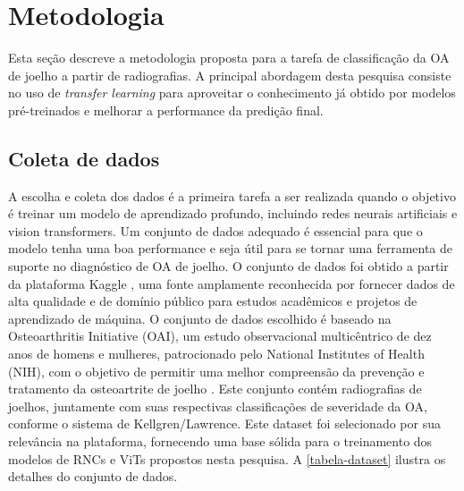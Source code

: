 \chapter{Metodologia}\label{cap:proposta}

Esta seção descreve a metodologia proposta para a tarefa de classificação da OA de joelho a partir de radiografias. A principal abordagem desta pesquisa consiste no uso de \textit{transfer learning} para aproveitar o conhecimento já obtido por modelos pré-treinados e melhorar a performance da predição final.

\section{Coleta de dados}

A escolha e coleta dos dados é a primeira tarefa a ser realizada quando o objetivo é treinar um modelo de aprendizado profundo, incluindo redes neurais artificiais e vision transformers. Um conjunto de dados adequado é essencial para que o modelo tenha uma boa performance e seja útil para se tornar uma ferramenta de suporte no diagnóstico de OA de joelho. O conjunto de dados foi obtido a partir da plataforma Kaggle \cite{dataset-kaggle}, uma fonte amplamente reconhecida por fornecer dados de alta qualidade e de domínio público para estudos acadêmicos e projetos de aprendizado de máquina. O conjunto de dados escolhido é baseado na Osteoarthritis Initiative (OAI), um estudo observacional multicêntrico de dez anos de homens e mulheres, patrocionado pelo National Institutes of Health (NIH), com o objetivo de permitir uma melhor compreensão da prevenção e tratamento da osteoartrite de joelho \cite{oai}. Este conjunto contém radiografias de joelhos, juntamente com suas respectivas classificações de severidade da OA, conforme o sistema de Kellgren/Lawrence. Este dataset foi selecionado por sua relevância na plataforma, fornecendo uma base sólida para o treinamento dos modelos de RNCs e ViTs propostos nesta pesquisa. A \autoref{tabela-dataset} ilustra os detalhes do conjunto de dados.

